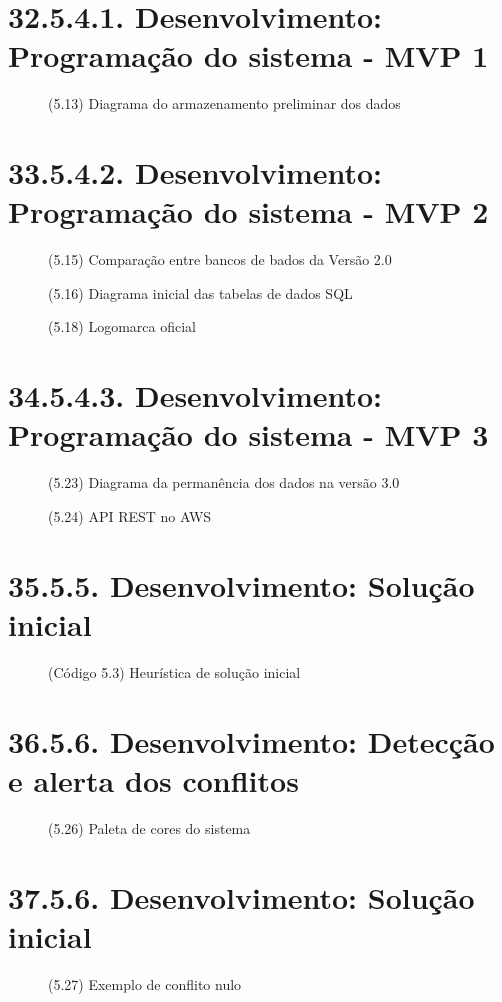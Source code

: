 \chapter*{32.5.4.1. Desenvolvimento: Programação do sistema - MVP 1}
\begin{figure}[htpb]\caption{(5.13) Diagrama do armazenamento preliminar dos dados}\end{figure}
\chapter*{33.5.4.2. Desenvolvimento: Programação do sistema - MVP 2}
\begin{figure}[htpb]\caption{(5.15) Comparação entre bancos de bados da Versão 2.0}\end{figure}
\begin{figure}[htpb]\caption{(5.16) Diagrama inicial das tabelas de dados SQL}\end{figure}
\begin{figure}[htpb]\caption{(5.18) Logomarca oficial}\end{figure}
\chapter*{34.5.4.3. Desenvolvimento: Programação do sistema - MVP 3}
\begin{figure}[htpb]\caption{(5.23) Diagrama da permanência dos dados na versão 3.0}\end{figure}
\begin{figure}[htpb]\caption{(5.24) API REST no AWS}\end{figure}
\chapter*{35.5.5. Desenvolvimento: Solução inicial}
\begin{figure}[htpb]\caption{(Código 5.3) Heurística de solução inicial}\end{figure}
\chapter*{36.5.6. Desenvolvimento: Detecção e alerta dos conflitos}
\begin{figure}[htpb]\caption{(5.26) Paleta de cores do sistema}\end{figure}
\chapter*{37.5.6. Desenvolvimento: Solução inicial}
\begin{figure}[htpb]\caption{(5.27) Exemplo de conflito nulo}\end{figure}
